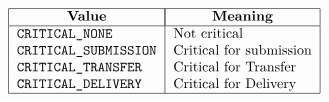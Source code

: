 \[\begin{tabular}{|l| l|}
\hline
	\multicolumn{1}{|c|}{\bf Value} &
		\multicolumn{1}{|c|}{\bf Meaning} \\
\hline
	\tt CRITICAL\_NONE&		Not critical\\
	\tt CRITICAL\_SUBMISSION&	Critical for submission\\
	\tt CRITICAL\_TRANSFER&		Critical for Transfer\\
	\tt CRITICAL\_DELIVERY&		Critical for Delivery\\
\hline
\end{tabular}\]
